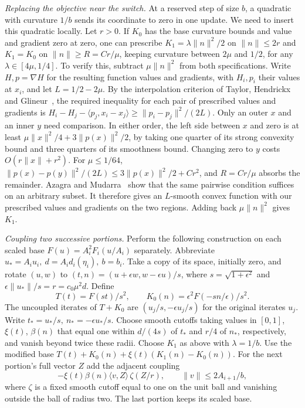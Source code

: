 \documentclass[11pt]{article}
\theoremstyle{definition}
\begin{document}
\emph{Replacing the objective near the switch.} At a reserved step of size \(b\), a quadratic with curvature \(1/b\) sends its coordinate to zero in one update. We need to insert this quadratic locally. Let \(r>0\). If \(K_0\) has the base curvature bounds and value and gradient
zero at zero, one can prescribe \(K_1=\lambda\|n\|^2/2\) on
\(\|n\|\le2r\) and \(K_1=K_0\) on \(\|n\|\ge R=C r/\mu\),
keeping curvature between \(2\mu\) and \(1/2\), for any
\(\lambda\in[4\mu,1/4]\). To verify this, subtract
\(\mu\|n\|^2\) from both specifications. Write \(H,p=\nabla H\)
for the resulting function values and gradients, with \(H_i,p_i\) their
values at \(x_i\), and let \(L=1/2-2\mu\). By the interpolation criterion
of Taylor, Hendrickx and Glineur~\cite[Corollary~1]{THG}, the required
inequality for each pair of prescribed values and gradients is
\(H_i-H_j-\langle p_j,x_i-x_j\rangle\ge\|p_i-p_j\|^2/(2L)\).
Only an outer \(x\) and an inner \(y\) need comparison. In either
order, the left side between \(x\) and zero is at least
\(\mu\|x\|^2/4+3\|p(x)\|^2/2\), by taking one quarter of its
strong convexity bound and three quarters of its smoothness bound.
Changing zero to \(y\) costs \(O(r\|x\|+r^2)\). For
\(\mu\le1/64\), \(\|p(x)-p(y)\|^2/(2L)\le
3\|p(x)\|^2/2+Cr^2\), and \(R=Cr/\mu\) absorbs the remainder.
Azagra and Mudarra~\cite[Theorem~1.3]{AM} show that the same pairwise
condition suffices on an arbitrary subset. It therefore gives an
\(L\)-smooth convex function with our prescribed values and gradients
on the two regions. Adding back \(\mu\|n\|^2\) gives \(K_1\).

\emph{Coupling two successive portions.} Perform the following construction on each scaled base
\(F(u)=A_i^2 F_i(u/A_i)\) separately. Abbreviate
\(u_*=A_iu_i,\ d=A_i d_i(\eta_i),\ b=b_i\).
Take a copy of its space, initially zero, and rotate \((u,w)\)
to \((t,n)= (u+\epsilon w,w-\epsilon u)/s\), where
\(s=\sqrt{1+\epsilon^2}\) and
\(\epsilon\|u_*\|/s=r=c_0\mu^2d\). Define
\[
 T(t)=F(st)/s^2,\qquad K_0(n)=\epsilon^2 F(-sn/\epsilon)/s^2.
\]
The uncoupled iterates of \(T+K_0\) are
\((u_j/s,-\epsilon u_j/s)\) for the original iterates \(u_j\).
Write \(t_*=u_*/s,\ n_*=-\epsilon u_*/s\). Choose smooth cutoffs taking values in \([0,1]\),
\(\xi(t)\), \(\beta(n)\) that equal one within \(d/(4s)\) of \(t_*\)
and \(r/4\) of \(n_*\), respectively, and vanish beyond twice
these radii. Choose \(K_1\) as above with \(\lambda=1/b\).
Use the modified base
\(T(t)+K_0(n)+\xi(t)(K_1(n)-K_0(n))\).
For the next portion's full vector \(Z\) add the adjacent coupling
\[
 -\xi(t)\beta(n)\langle v,Z\rangle\,\zeta(Z/r),\qquad
 \|v\|\le 2 A_{i+1}/b,
\]
where \(\zeta\) is a fixed smooth cutoff equal to one on the unit
ball and vanishing outside the ball of radius two. The last portion
keeps its scaled base.
\end{document}
